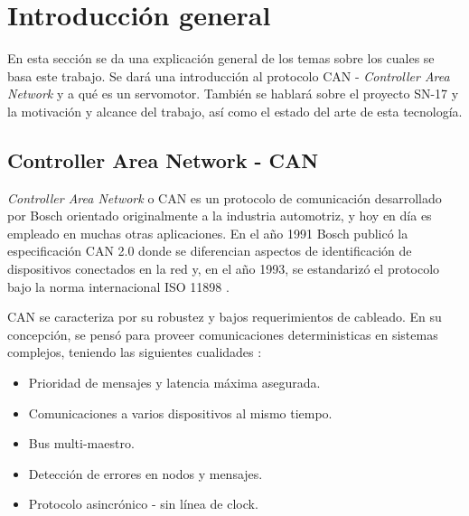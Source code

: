 
\chapter{Introducción general} %

\label{Chapter1} %
\label{IntroGeneral}


\newcommand{\keyword}[1]{\textbf{#1}}
\newcommand{\tabhead}[1]{\textbf{#1}}
\newcommand{\code}[1]{\texttt{#1}}
\newcommand{\file}[1]{\texttt{\bfseries#1}}
\newcommand{\option}[1]{\texttt{\itshape#1}}
\newcommand{\grados}{$^{\circ}$}



En esta sección se da una explicación general de los temas sobre los cuales se basa este trabajo. Se dará una introducción al protocolo CAN - \textit{Controller Area Network} y a qué es un servomotor. También se hablará sobre el proyecto SN-17 y la motivación y alcance del trabajo, así como el estado del arte de esta tecnología.

\section{Controller Area Network - CAN}

\textit{Controller Area Network} o CAN es un protocolo de comunicación desarrollado por Bosch \citep{wikipedia_CAN} orientado originalmente a la industria automotriz, y hoy en día es empleado en muchas otras aplicaciones. En el año 1991 Bosch publicó la especificación CAN 2.0 donde se diferencian aspectos de identificación de dispositivos conectados en la red y, en el año 1993, se estandarizó el protocolo bajo la norma internacional ISO 11898 \citep{web_ISO_CAN}.

CAN se caracteriza por su robustez y bajos requerimientos de cableado. En su concepción, se pensó para proveer comunicaciones deterministicas en sistemas complejos, teniendo las siguientes cualidades \citep{Understanding_CAN}:
\begin{itemize}
	\item Prioridad de mensajes y latencia máxima asegurada.
	\item Comunicaciones a varios dispositivos al mismo tiempo.	
	\item Bus multi-maestro.
	\item Detección de errores en nodos y mensajes.
	\item Protocolo asincrónico - sin línea de clock.
\end{itemize}

